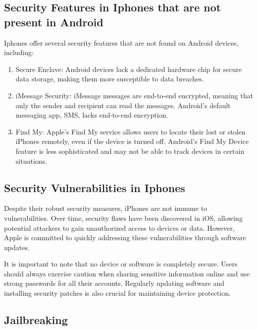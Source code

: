 \documentclass[11pt]{article}
\begin{document}
\subsection{Security Features in Iphones that are not present in Android}

Iphones offer several security features that are not found on Android devices,
including:

\begin{enumerate}
      \item Secure Enclave: Android devices lack a dedicated hardware chip for secure data
            storage, making them more susceptible to data breaches.

      \item iMessage Security: iMessage messages are end-to-end encrypted, meaning that
            only the sender and recipient can read the messages. Android's default
            messaging app, SMS, lacks end-to-end encryption.

      \item Find My: Apple's Find My service allows users to locate their lost or stolen
            iPhones remotely, even if the device is turned off. Android's Find My Device
            feature is less sophisticated and may not be able to track devices in certain
            situations.
\end{enumerate}

\subsection{Security Vulnerabilities in Iphones}

Despite their robust security measures, iPhones are not immune to
vulnerabilities. Over time, security flaws have been discovered in iOS,
allowing potential attackers to gain unauthorized access to devices or data.
However, Apple is committed to quickly addressing these vulnerabilities through
software updates.

It is important to note that no device or software is completely secure. Users
should always exercise caution when sharing sensitive information online and
use strong passwords for all their accounts. Regularly updating software and
installing security patches is also crucial for maintaining device protection.

\subsection{Jailbreaking}
\end{document}
